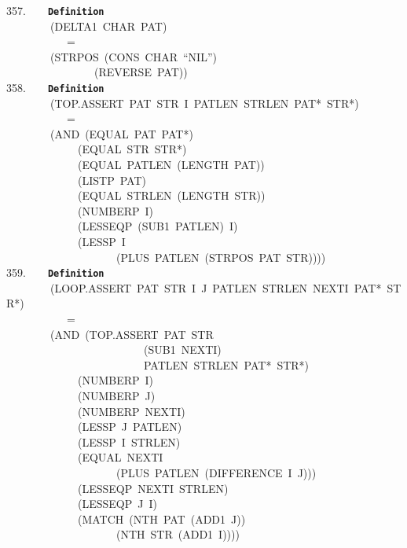 \documentclass[11pt]{book}
\newenvironment{pubasis}{\begin{flushleft}\ttfamily\small}{\normalsize\rmfamily\end{flushleft}}
\newcommand{\axiomordefinition}[1]{\vspace{6pt}\texttt{\textbf{#1}}}
\begin{document}
\begin{pubasis}
357.~~~~\axiomordefinition{Definition}\\
~~~~~~~~(DELTA1~CHAR~PAT)\\
~~~~~~~~~~~=\\
~~~~~~~~(STRPOS~(CONS~CHAR~``NIL'')\\
~~~~~~~~~~~~~~~~(REVERSE~PAT))\\

358.~~~~\axiomordefinition{Definition}\\
~~~~~~~~(TOP.ASSERT~PAT~STR~I~PATLEN~STRLEN~PAT*~STR*)\\
~~~~~~~~~~~=\\
~~~~~~~~(AND~(EQUAL~PAT~PAT*)\\
~~~~~~~~~~~~~(EQUAL~STR~STR*)\\
~~~~~~~~~~~~~(EQUAL~PATLEN~(LENGTH~PAT))\\
~~~~~~~~~~~~~(LISTP~PAT)\\
~~~~~~~~~~~~~(EQUAL~STRLEN~(LENGTH~STR))\\
~~~~~~~~~~~~~(NUMBERP~I)\\
~~~~~~~~~~~~~(LESSEQP~(SUB1~PATLEN)~I)\\
~~~~~~~~~~~~~(LESSP~I\\
~~~~~~~~~~~~~~~~~~~~(PLUS~PATLEN~(STRPOS~PAT~STR))))\\

359.~~~~\axiomordefinition{Definition}\\
~~~~~~~~(LOOP.ASSERT~PAT~STR~I~J~PATLEN~STRLEN~NEXTI~PAT*~STR*)\\
~~~~~~~~~~~=\\
~~~~~~~~(AND~(TOP.ASSERT~PAT~STR\\
~~~~~~~~~~~~~~~~~~~~~~~~~(SUB1~NEXTI)\\
~~~~~~~~~~~~~~~~~~~~~~~~~PATLEN~STRLEN~PAT*~STR*)\\
~~~~~~~~~~~~~(NUMBERP~I)\\
~~~~~~~~~~~~~(NUMBERP~J)\\
~~~~~~~~~~~~~(NUMBERP~NEXTI)\\
~~~~~~~~~~~~~(LESSP~J~PATLEN)\\
~~~~~~~~~~~~~(LESSP~I~STRLEN)\\
~~~~~~~~~~~~~(EQUAL~NEXTI\\
~~~~~~~~~~~~~~~~~~~~(PLUS~PATLEN~(DIFFERENCE~I~J)))\\
~~~~~~~~~~~~~(LESSEQP~NEXTI~STRLEN)\\
~~~~~~~~~~~~~(LESSEQP~J~I)\\
~~~~~~~~~~~~~(MATCH~(NTH~PAT~(ADD1~J))\\
~~~~~~~~~~~~~~~~~~~~(NTH~STR~(ADD1~I))))\\


\end{pubasis}
\end{document}
